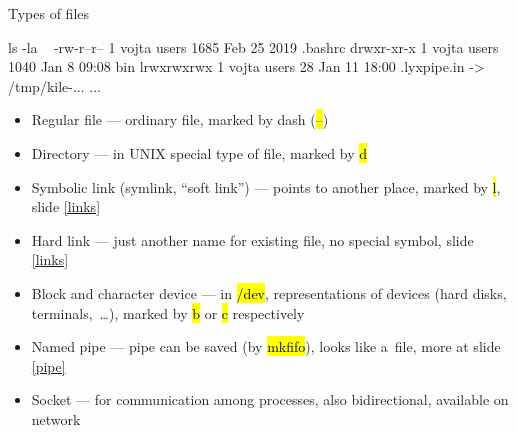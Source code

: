 \documentclass[compress, ucs, xelatex, 11pt, xcolor=svgnames, aspectratio=169,
	hyperref={
		bookmarks=true,
		unicode=true,
		colorlinks=true,
		pdftitle={Linux, command line and MetaCentrum},
		plainpages=false,
		pdfauthor={Vojtech Zeisek},
		pdfsubject={Course about use of Linux command line, writing shell scripts and using MetaCentrum of CESNET},
		pdfcreator={XeLaTeX},
		pdfkeywords={Linux, GNU, BASH, shell, command line, MetaCentrum},
		linkcolor=DarkRed, %
		anchorcolor=DarkBlue, %
		citecolor=Indigo, %
		filecolor=NavyBlue, %
		menucolor=DarkMagenta, %
		urlcolor=DarkBlue, %
		pdftex},
	url={hyphens, lowtilde} %
	]{beamer}
\renewcommand{\texttt}[1]{\hl{\ttfamily #1}}
\begin{document}
\begin{frame}[fragile]{Types of files}
	\begin{bashcode}
    ls -la ~
    -rw-r--r-- 1 vojta users 1685 Feb 25  2019 .bashrc
    drwxr-xr-x 1 vojta users 1040 Jan  8 09:08 bin
    lrwxrwxrwx 1 vojta users   28 Jan 11 18:00 .lyxpipe.in -> /tmp/kile-...
    ...
	\end{bashcode}
	\vfill
	\begin{itemize}
		\item Regular file --- ordinary file, marked by dash (\texttt{--})
		\item Directory --- in UNIX special type of file, marked by \texttt{d}
		\item Symbolic link (symlink, \enquote{soft link}) --- points to another place, marked by \texttt{l}, slide \ref{links}
		\item Hard link --- just another name for existing file, no special symbol, slide \ref{links}
		\item Block and character device --- in \texttt{/dev}, representations of devices (hard disks, terminals,~\ldots), marked by \texttt{b} or \texttt{c} respectively
		\item Named pipe --- pipe can be saved (by \texttt{mkfifo}), looks like a~file, more at slide \ref{pipe}
		\item Socket --- for communication among processes, also bidirectional, available on network
	\end{itemize}
\end{frame}
\end{document}
